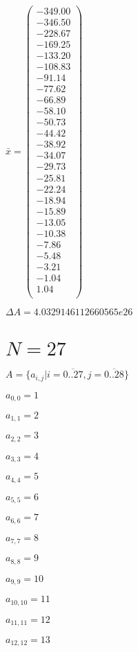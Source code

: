 \documentclass[a4paper,12pt]{article}
\begin{document}
$\bar { x } = \begin{pmatrix}
-349.00 \\
-346.50 \\
-228.67 \\
-169.25 \\
-133.20 \\
-108.83 \\
-91.14 \\
-77.62 \\
-66.89 \\
-58.10 \\
-50.73 \\
-44.42 \\
-38.92 \\
-34.07 \\
-29.73 \\
-25.81 \\
-22.24 \\
-18.94 \\
-15.89 \\
-13.05 \\
-10.38 \\
-7.86 \\
-5.48 \\
-3.21 \\
-1.04 \\
1.04 \\
\end{pmatrix}
$

$\Delta A = 4.0329146112660565e26$



\section{ $N = 27$ }
$A = \{ a _{ i, j } | i = \overline { 0..27 }, j = \overline { 0..28 } \}$

$a _{ 0, 0 } = 1$

$a _{ 1, 1 } = 2$

$a _{ 2, 2 } = 3$

$a _{ 3, 3 } = 4$

$a _{ 4, 4 } = 5$

$a _{ 5, 5 } = 6$

$a _{ 6, 6 } = 7$

$a _{ 7, 7 } = 8$

$a _{ 8, 8 } = 9$

$a _{ 9, 9 } = 10$

$a _{ 10, 10 } = 11$

$a _{ 11, 11 } = 12$

$a _{ 12, 12 } = 13$
\end{document}
